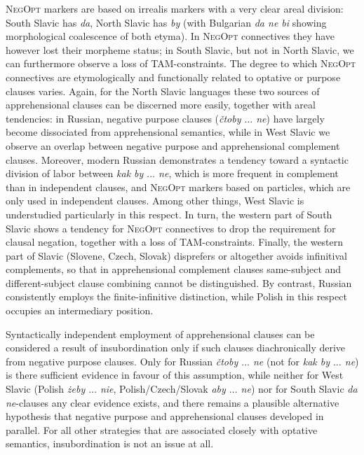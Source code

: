\documentclass[output=paper,colorlinks,citecolor=brown]{langscibook}
\begin{document}
\textsc{NegOpt} markers are based on irrealis markers with a very clear areal division: South Slavic has \textit{da}, North Slavic has \textit{by} (with Bulgarian \textit{da ne bi} showing morphological coalescence of both etyma). In \textsc{NegOpt} connectives they have however lost their morpheme status; in South Slavic, but not in North Slavic, we can furthermore observe a loss of TAM-constraints. The degree to which \textsc{NegOpt} connectives are etymologically and functionally related to optative or purpose clauses varies. Again, for the North Slavic languages these two sources of apprehensional clauses can be discerned more easily, together with areal tendencies: in Russian, negative purpose clauses (\textit{čtoby $\ldots$ ne}) have largely become dissociated from apprehensional semantics, while in West Slavic we observe an overlap between negative purpose and apprehensional complement clauses. Moreover, modern Russian demonstrates a tendency toward a syntactic division of labor between \textit{kak by $\ldots$  ne}, which is more frequent in complement than in independent clauses, and \textsc{NegOpt} markers based on particles, which are only used in independent clauses. Among other things, West Slavic is understudied particularly in this respect. In turn, the western part of South Slavic shows a tendency for \textsc{NegOpt} connectives to drop the requirement for clausal negation, together with a loss of TAM-constraints. Finally, the western part of Slavic (Slovene, Czech, Slovak) disprefers or altogether avoids infinitival complements, so that in apprehensional complement clauses same-subject and different-subject clause combining cannot be distinguished. By contrast, Russian consistently employs the finite-infinitive distinction, while Polish in this respect occupies an intermediary position.


Syntactically independent employment of apprehensional clauses can be considered a result of insubordination only if such clauses diachronically derive from negative purpose clauses. Only for Russian \textit{čtoby $\ldots$  ne} (not for \textit{kak by $\ldots$  ne}) is there sufficient evidence in favour of this assumption, while neither for West Slavic (Polish \textit{żeby $\ldots$  nie}, Polish/Czech/Slovak \textit{aby $\ldots$ ne}) nor for South Slavic \textit{da ne}-clauses any clear evidence exists, and there remains a plausible alternative hypothesis that negative purpose and apprehensional clauses developed in parallel. For all other strategies that are associated closely with optative semantics, insubordination is not an issue at all.
\end{document}
